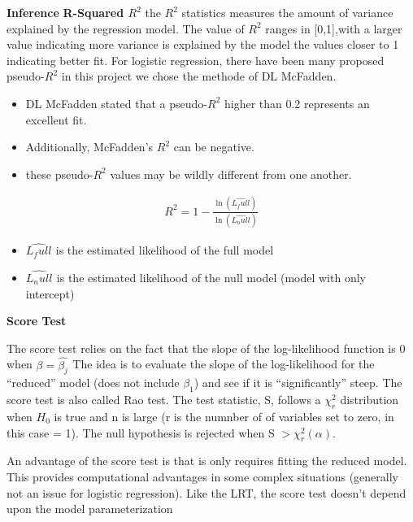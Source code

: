 \textbf{\Large Inference }
\newline
\textbf{R-Squared $R^2$}
\newline
the $R^2$ statistics measures the amount of variance explained by the regression model. The value of $R^2$ ranges in [0,1],with a larger value indicating more variance is explained by the model the values closer to 1 indicating better fit. 
For logistic regression, there have been many proposed pseudo-$R^2$
in this project we chose the methode of DL McFadden.
\begin{itemize}
\item DL McFadden stated that a pseudo-$R^2$ higher than 0.2 represents an excellent fit.
\item Additionally, McFadden’s $R^2$ can be negative.
\item these pseudo-$R^2$ values may be wildly different from one another.
\end{itemize}
\begin{align*}
R^2=1 - \frac{\ln({\hat{L_full}^{ }})}{\ln({\hat{L_null}^{ }})}
\end{align*}
\begin{itemize}
\item \(\hat{L_full}^{ }\)  is the estimated likelihood of the full model
\item \(\hat{L_null}^{ }\) is the estimated likelihood of the null model (model with only intercept)
\end{itemize}
\newline
\textbf{Score Test}


The score test relies on the fact that the slope of the log-likelihood function is 0 when \(\beta = \hat{\beta_j}^{ } \)
The idea is to evaluate the slope of the log-likelihood for the “reduced” model (does not include $\beta_1$) and see if it is “significantly” steep. The score test is also called Rao test. The test statistic, S, follows a  $\chi_r^2$ distribution when $H_0$ is true and n is large (r is the numnber of of variables set to zero, in this case = 1). The null hypothesis is rejected when S $>\chi_r^2(\alpha)$.

An advantage of the score test is that is only requires fitting the reduced model. This provides computational advantages in some complex situations (generally not an issue for logistic regression). Like the LRT, the score test doesn’t depend upon the model parameterization











